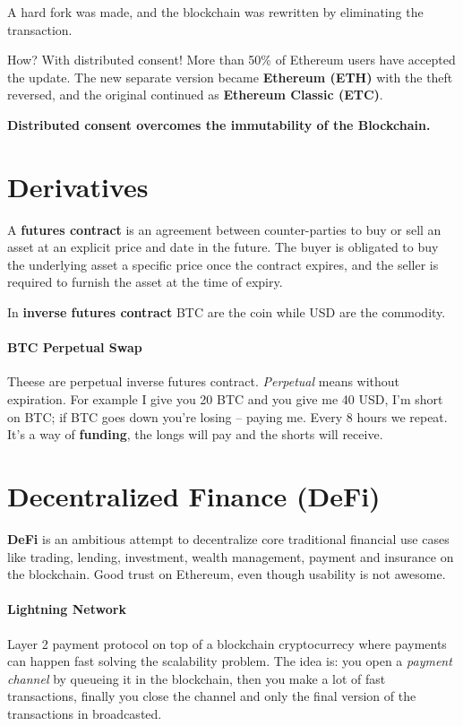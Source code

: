 A hard fork was made, and the blockchain was rewritten by eliminating the transaction.

How? With distributed consent! More than 50\% of Ethereum users have accepted the update. The new separate version became \textbf{Ethereum (ETH)} with the theft reversed, and the original continued as \textbf{Ethereum Classic (ETC)}.

\textbf{Distributed consent overcomes the immutability of the Blockchain.}

\section{Derivatives}

A \textbf{futures contract} is an agreement between counter-parties to buy or sell an asset at an explicit price and date in the future. The buyer is obligated to buy the underlying asset a specific price once the contract expires, and the seller is required to furnish the asset at the time of expiry.

In \textbf{inverse futures contract} BTC are the coin while USD are the commodity.

\paragraph{BTC Perpetual Swap} Theese are perpetual inverse futures contract. \emph{Perpetual} means without expiration. For example I give you 20 BTC and you give me 40 USD, I'm short on BTC; if BTC goes down you're losing -- paying me. Every 8 hours we repeat. It's a way of \textbf{funding}, the longs will pay and the shorts will receive.

\section{Decentralized Finance (DeFi)}

\textbf{DeFi} is an ambitious attempt to decentralize core traditional financial use cases like trading, lending, investment, wealth management, payment and insurance on the blockchain. Good trust on Ethereum, even though usability is not awesome.

\paragraph{Lightning Network} Layer 2 payment protocol on top of a blockchain cryptocurrecy where payments can happen fast solving the scalability problem. The idea is: you open a \emph{payment channel} by queueing it in the blockchain, then you make a lot of fast transactions, finally you close the channel and only the final version of the transactions in broadcasted.

